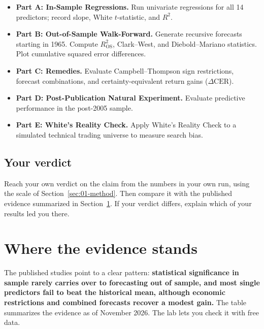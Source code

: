 \begin{itemize}
  \item \textbf{Part A: In-Sample Regressions.} Run univariate regressions for all 14 predictors; record slope, White $t$-statistic, and $R^2$.
  \item \textbf{Part B: Out-of-Sample Walk-Forward.} Generate recursive forecasts starting in 1965. Compute $R^2_{\text{OS}}$, Clark--West, and Diebold--Mariano statistics. Plot cumulative squared error differences.
  \item \textbf{Part C: Remedies.} Evaluate Campbell--Thompson sign restrictions, forecast combinations, and certainty-equivalent return gains ($\Delta \text{CER}$).
  \item \textbf{Part D: Post-Publication Natural Experiment.} Evaluate predictive performance in the post-2005 sample.
  \item \textbf{Part E: White's Reality Check.} Apply White's Reality Check to a simulated technical trading universe to measure search bias.
\end{itemize}

\subsection*{Your verdict}

Reach your own verdict on the claim from the numbers in your own run, using the scale of Section~\ref{sec:01-method}. Then compare it with the published evidence summarized in Section~\ref{sec:09-verdict}. If your verdict differs, explain which of your results led you there.

\section{Where the evidence stands}
\label{sec:09-verdict}

The published studies point to a clear pattern: \textbf{statistical significance in sample rarely carries over to forecasting out of sample, and most single predictors fail to beat the historical mean, although economic restrictions and combined forecasts recover a modest gain.} The table summarizes the evidence as of November 2026. The lab lets you check it with free data.

